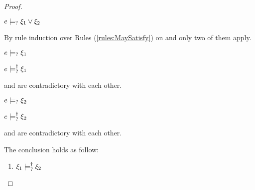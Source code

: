 \begin{proof}
\begin{byCases}
\begin{byCases}
  \end{byCases}

\item[\text{(\ref{rule:CMSPossibly})}]
  \begin{pfsteps*}
  \item $e \models_{?} \xi_1 \vee \xi_2$  
  \end{pfsteps*}
  By rule induction over Rules (\ref{rules:MaySatisfy}) on  and only two of them apply.
  \begin{byCases}

  \item[\text{(\ref{rule:CPSOr1})}]
    \begin{pfsteps*}
    \item $e \models_{?} \xi_1$  
    \item $e \models_{?}^{\dag} \xi_1$  
    \end{pfsteps*}
     and  are contradictory with each other.

  \item[\text{(\ref{rule:CPSOr2})}]
    \begin{pfsteps*}
    \item $e \models_{?} \xi_2$  
    \item $e \models_{?}^{\dag} \xi_2$  
    \end{pfsteps*}
     and  are contradictory with each other.

  \end{byCases}
\end{byCases}
The conclusion holds as follow:
\begin{enumerate}
  \item $\xi_1 \models_{?}^{\dag} \xi_2$
\end{enumerate}
\resetpfcounter
\end{proof}

